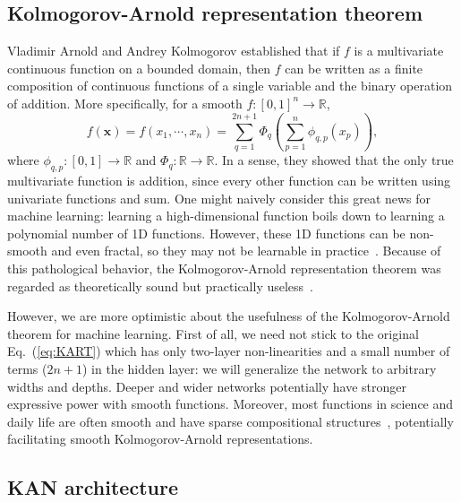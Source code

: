 \documentclass[12pt]{caltech_thesis}
\numberwithin{equation}{section}
\begin{document}
\subsection{Kolmogorov-Arnold representation theorem}\label{subsec:kart}

Vladimir Arnold and Andrey Kolmogorov established that if $f$ is a multivariate continuous function on a bounded domain, then $f$ can be written as a finite composition of continuous functions of a single variable and the binary operation of addition. More specifically, for a smooth $f:[0,1]^n\to\mathbb{R}$,
\begin{equation}\label{eq:KART}
    f(\mathbf{x}) = f(x_1,\cdots,x_n)=\sum_{q=1}^{2n+1} \Phi_q\left(\sum_{p=1}^n\phi_{q,p}(x_p)\right),
\end{equation}
where $\phi_{q,p}:[0,1]\to\mathbb{R}$ and $\Phi_q:\mathbb{R}\to\mathbb{R}$. In a sense, they showed that the only true multivariate function is addition, since every other function can be written using univariate functions and sum. One might naively consider this great news for machine learning: learning a high-dimensional function boils down to learning a polynomial number of 1D functions. However, these 1D functions can be non-smooth and even fractal, so they may not be learnable in practice~\cite{poggio2020theoretical}. Because of this pathological behavior, the Kolmogorov-Arnold representation theorem was regarded as theoretically sound but practically useless~\cite{poggio2020theoretical}. 

However, we are more optimistic about the usefulness of the Kolmogorov-Arnold theorem for machine learning. First of all, we need not stick to the original Eq.~(\ref{eq:KART}) which has only two-layer non-linearities and a small number of terms ($2n+1$) in the hidden layer: we will generalize the network to arbitrary widths and depths. Deeper and wider networks potentially have stronger expressive power with smooth functions. Moreover, most functions in science and daily life are often smooth and have sparse compositional structures~\cite{lin2017does}, potentially facilitating smooth Kolmogorov-Arnold representations.

\subsection{KAN architecture}\label{subsec:kan_architecture} 
\end{document}
